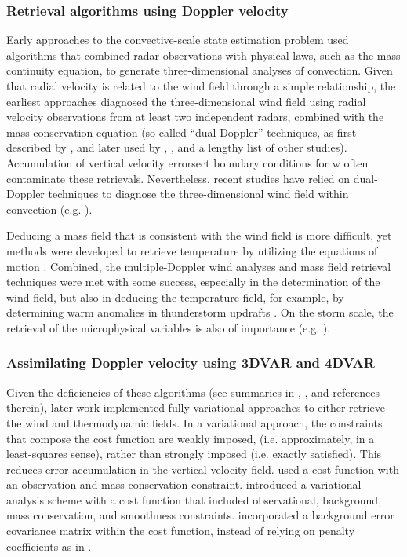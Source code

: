 \subsubsection{Retrieval algorithms using Doppler velocity}
Early approaches to the convective-scale state estimation problem used algorithms that combined radar observations with physical laws, such as the mass continuity equation, to generate three-dimensional analyses of convection. Given that radial velocity is related to the wind field through a simple relationship, the earliest approaches diagnosed the three-dimensional wind field using radial velocity observations from at least two independent radars, combined with the mass conservation equation (so called “dual-Doppler” techniques, as first described by \citet{armijo69}, and later used by \citet{rayetal75}, \citet{brandes77}, and a lengthy list of other studies). Accumulation of vertical velocity errors\citet{brandes77}ect boundary conditions for w often contaminate these retrievals. Nevertheless, recent studies have relied on dual-Doppler techniques to diagnose the three-dimensional wind field within convection (e.g. \citealt{markowskietal08}).

Deducing a mass field that is consistent with the wind field is more difficult, yet methods were developed to retrieve temperature by utilizing the equations of motion \citep{galchen78, hanescott78, haneetal81, roux85}. Combined, the multiple-Doppler wind analyses and mass field retrieval techniques were met with some success, especially in the determination of the wind field, but also in deducing the temperature field, for example, by determining warm anomalies in thunderstorm updrafts \citep{brandes84}. On the storm scale, the retrieval of the microphysical variables is also of importance (e.g. \citealt{ziegler85,ziegler88}).

\subsubsection{Assimilating Doppler velocity using 3DVAR and 4DVAR}
Given the deficiencies of these algorithms (see summaries in \citealt{shapiromewes99}, \citealt{gaoetal99}, and references therein), later work implemented fully variational approaches to either retrieve the wind and thermodynamic fields. In a variational approach, the constraints that compose the cost function are weakly imposed, (i.e. approximately, in a least-squares sense), rather than strongly imposed (i.e. exactly satisfied). This reduces error accumulation in the vertical velocity field. \citet{shapiromewes99} used a cost function with an observation and mass conservation constraint. \citet{gaoetal99} introduced a variational analysis scheme with a cost function that included observational, background, mass conservation, and smoothness constraints. \citet{gaoetal04} incorporated a background error covariance matrix within the cost function, instead of relying on penalty coefficients as in \citet{gaoetal99}.

